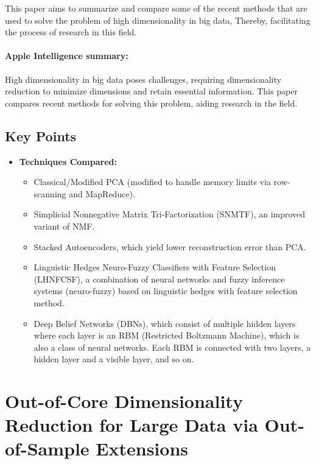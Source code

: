 \documentclass[a4paper,12pt]{article}
\begin{document}
This paper aims to summarize and compare some of the recent methods that are used to solve the problem of high dimensionality in big data, Thereby, facilitating the process of research in this field.

\paragraph{Apple Intelligence summary:} High dimensionality in big data poses challenges, requiring dimensionality reduction to minimize dimensions and retain essential information. This paper compares recent methods for solving this problem, aiding research in the field.


\subsection{Key Points}

\begin{itemize}
    \item \textbf{Techniques Compared:}
        \begin{itemize}
            \item Classical/Modified PCA (modified to handle memory limits via row-scanning and MapReduce).
            \item Simplicial Nonnegative Matrix Tri-Factorization (SNMTF), an improved variant of NMF.
            \item Stacked Autoencoders, which yield lower reconstruction error than PCA.
            \item Linguistic Hedges Neuro-Fuzzy Classifiers with Feature Selection (LHNFCSF), a combination of neural networks and fuzzy inference systems (neuro-fuzzy) based on linguistic hedges with feature selection method.
            \item Deep Belief Networks (DBNs), which consist of multiple hidden layers where each layer is an RBM (Restricted Boltzmann Machine), which is also a class of neural networks. Each RBM is connected with two layers, a hidden layer and a visible layer, and so on.
        \end{itemize}
\end{itemize}


\pagebreak
\section{Out-of-Core Dimensionality Reduction for Large Data via Out-of-Sample Extensions \texorpdfstring{\cite{reichmann2024outofcoredimensionalityreductionlarge}}{}}
\label{sec:reichmann2024outofcoredimensionalityreductionlarge}
\end{document}
